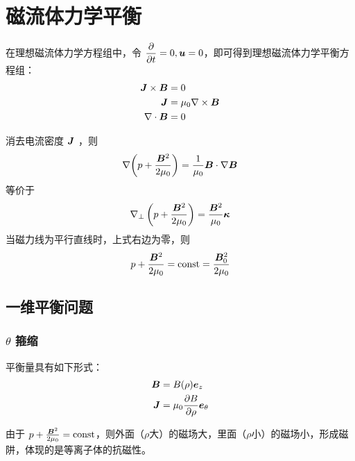 
\chapter{磁流体力学平衡}

在理想磁流体力学方程组中，令 $\dfrac{\partial {}}{\partial {t}} = 0, \bm{u} = 0$，即可得到理想磁流体力学平衡方程组：
\begin{subequations}\begin{align}
    \bm{J} \times \bm{B} &= 0 \\
    \bm{J} &= \mu_0 \nabla \times {\bm{B}} \\
    \nabla \cdot {\bm{B}} &= 0
\end{align}\end{subequations}

消去电流密度 $\bm{J}$ ，则
\begin{equation}
    \nabla {\left( p + \frac{\bm{B}^2}{2 \mu_0} \right)} = \frac{1}{\mu_0} \bm{B} \cdot \nabla {\bm{B}}
\end{equation}
等价于
\begin{equation}
    \nabla_\perp \left( p + \frac{\bm{B}^2}{2 \mu_0} \right) = \frac{\bm{B}^2}{\mu_0} \bm{\kappa}
\end{equation}
当磁力线为平行直线时，上式右边为零，则
\begin{equation}
    p + \frac{\bm{B}^2}{2 \mu_0} = \text{const} = \frac{\bm{B}_0^2}{2 \mu_0}
\end{equation}

\section{一维平衡问题}

\subsection{\texorpdfstring{$\theta$}{theta} 箍缩}

平衡量具有如下形式：
\begin{subequations}\begin{align}
\bm{B} &= B(\rho) \bm{e}_z \\
\bm{J} &= \mu_0 \frac{\partial {B}}{\partial {\rho}} \bm{e}_\theta
\end{align}\end{subequations}

由于 $p + \frac{\bm{B}^2}{2 \mu_0} = \text{const}$，则外面（$\rho$大）的磁场大，里面（$\rho$小）的磁场小，形成磁阱，体现的是等离子体的抗磁性。

